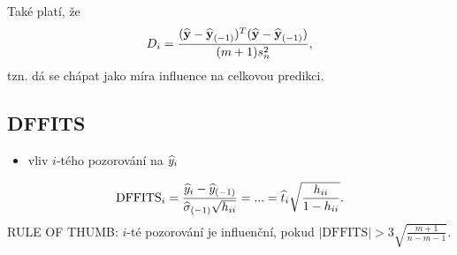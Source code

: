 \begin{remark}
	Také platí, že 
	$$ D_i=\frac{(\widehat{\textbf{y}}-{\widehat{\textbf{y}}_{(-1)}})^T(\widehat{\textbf{y}}-{\widehat{\textbf{y}}_{(-1)}})}{(m+1)s_n^2},$$
	tzn. dá se chápat jako míra influence na celkovou predikci.
\end{remark}

\subsection*{DFFITS}
\begin{itemize}
	\item vliv $i$-tého pozorování na $\widehat{y}_i$
\end{itemize}
$$ \mathrm{DFFITS}_i=\frac{\widehat{y}_i-{\widehat{y}_{(-1)}}}{{\widehat{{\sigma}}_{(-1)}}\sqrt{h_{ii}}}=...=\widehat{t}_i\sqrt{\frac{h_{ii}}{1-h_{ii}}}.$$
RULE OF THUMB: $i$-té pozorování je influenční, pokud $|\mathrm{DFFITS}|>3\sqrt{\frac{m+1}{n-m-1}}$.